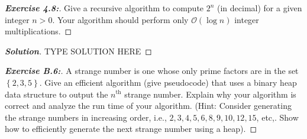 \documentclass[a4paper]{article}
\newenvironment{solution}{\begin{proof}[\textnormal{\textbf{Solution}}]}{\end{proof}}
\newenvironment{exercise}[1]{\begin{proof}[\textnormal{\textbf{Exercise #1:}}]\renewcommand{\qedsymbol}{}}{\end{proof}}
\newcommand{\bigO}[1]{\mathcal{O}\left(#1\right)}
\newcommand{\set}[1]{\left\lbrace#1\right\rbrace}
\newcommand{\ith}[1]{#1^{\text{th}}}
\begin{document}
\begin{exercise}{4.8}
    Give a recursive algorithm to compute \(2^n\) (in decimal) for a given integer \(n > 0\). Your algorithm should perform only \(\bigO{\log n}\) integer multiplications.
\end{exercise}

\begin{solution}
    TYPE SOLUTION HERE
\end{solution}

\begin{exercise}{B.6}
    A strange number is one whose only prime factors are in the set \(\set{2, 3, 5}\). Give an efficient algorithm (give pseudocode) that uses a binary heap data structure to output the \(\ith{n}\) strange number. Explain why your algorithm is correct and analyze the run time of your algorithm. (Hint: Consider generating the strange numbers in increasing order, i.e., \(2,3,4,5,6,8,9,10,12,15\), etc,. Show how to efficiently generate the next strange number using a heap).
\end{exercise}
\end{document}
